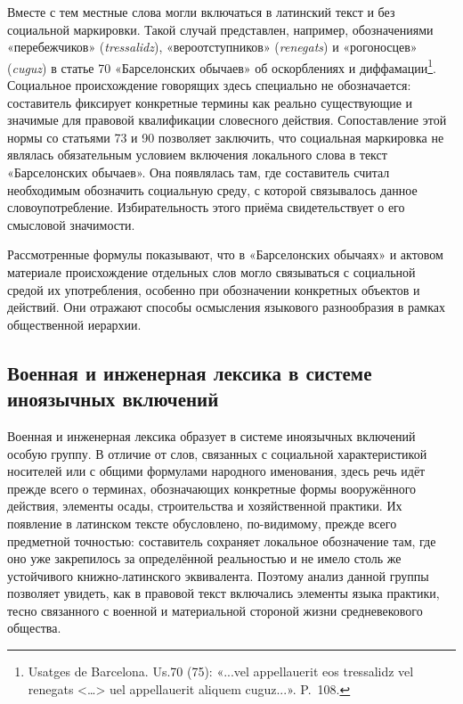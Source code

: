 Вместе с тем местные слова могли включаться в латинский текст и без социальной маркировки. Такой случай представлен, например, обозначениями «перебежчиков» (\emph{tressalidz}), «вероотступников» (\emph{renegats}) и «рогоносцев» (\emph{cuguz}) в статье 70 «Барселонских обычаев» об оскорблениях и диффамации\footnote{Usatges de Barcelona. Us.70 (75): «...vel appellauerit eos tressalidz vel renegats <…> uel appellauerit aliquem cuguz...». P.~108.}. Социальное происхождение говорящих здесь специально не обозначается: составитель фиксирует конкретные термины как реально существующие и значимые для правовой квалификации словесного действия. Сопоставление этой нормы со статьями 73 и 90 позволяет заключить, что социальная маркировка не являлась обязательным условием включения локального слова в текст «Барселонских обычаев». Она появлялась там, где составитель считал необходимым обозначить социальную среду, с которой связывалось данное словоупотребление. Избирательность этого приёма свидетельствует о его смысловой значимости.

Рассмотренные формулы показывают, что в «Барселонских обычаях» и актовом материале происхождение отдельных слов могло связываться с социальной средой их употребления, особенно при обозначении конкретных объектов и действий. Они отражают способы осмысления языкового разнообразия в рамках общественной иерархии.

\subsection{Военная и инженерная лексика в системе иноязычных включений}

Военная и инженерная лексика образует в системе иноязычных включений особую группу. В отличие от слов, связанных с социальной характеристикой носителей или с общими формулами народного именования, здесь речь идёт прежде всего о терминах, обозначающих конкретные формы вооружённого действия, элементы осады, строительства и хозяйственной практики. Их появление в латинском тексте обусловлено, по-видимому, прежде всего предметной точностью: составитель сохраняет локальное обозначение там, где оно уже закрепилось за определённой реальностью и не имело столь же устойчивого книжно-латинского эквивалента. Поэтому анализ данной группы позволяет увидеть, как в правовой текст включались элементы языка практики, тесно связанного с военной и материальной стороной жизни средневекового общества.


